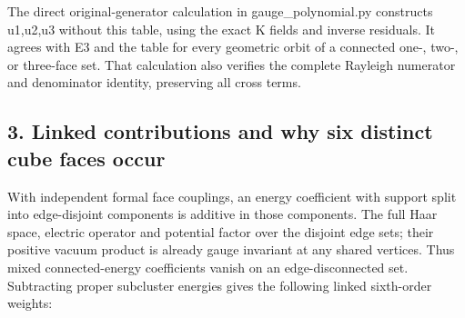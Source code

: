 \documentclass[11pt,a4paper]{article}
\renewcommand{\[}{\begingroup\small\originaldisplaystart}
\renewcommand{\]}{\originaldisplayend\endgroup}
\begin{document}
The direct original-generator calculation in
{\ttfamily g\allowbreak{}a\allowbreak{}u\allowbreak{}g\allowbreak{}e\allowbreak{}\_\allowbreak{}p\allowbreak{}o\allowbreak{}l\allowbreak{}y\allowbreak{}n\allowbreak{}o\allowbreak{}m\allowbreak{}i\allowbreak{}a\allowbreak{}l\allowbreak{}.\allowbreak{}p\allowbreak{}y\allowbreak{}}
constructs u1,u2,u3 without this table, using the exact K fields and
inverse residuals. It agrees with E3 and the table for every geometric
orbit of a connected one-, two-, or three-face set. That calculation
also verifies the complete Rayleigh numerator and denominator identity,
preserving all cross terms.

\subsection{3. Linked contributions and why six distinct cube faces
occur}\label{linked-contributions-and-why-six-distinct-cube-faces-occur}

With independent formal face couplings, an energy coefficient with
support split into edge-disjoint components is additive in those
components. The full Haar space, electric operator and potential factor
over the disjoint edge sets; their positive vacuum product is already
gauge invariant at any shared vertices. Thus mixed connected-energy
coefficients vanish on an edge-disconnected set. Subtracting proper
subcluster energies gives the following linked sixth-order weights:
\end{document}
